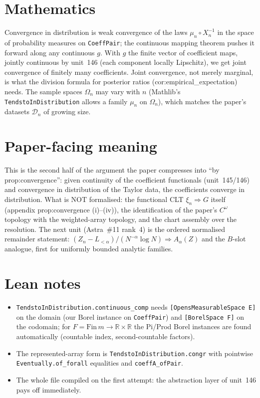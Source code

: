 \documentclass[11pt]{article}
\begin{document}
\section{Mathematics}
Convergence in distribution is weak convergence of the laws $\mu_n\circ X_n^{-1}$ in the space of
probability measures on \texttt{CoeffPair}; the continuous mapping theorem pushes it forward along
any continuous $g$. With $g$ the finite vector of coefficient maps, jointly continuous by unit~146
(each component locally Lipschitz), we get joint convergence of finitely many coefficients. Joint
convergence, not merely marginal, is what the division formula for posterior ratios
(cor:empirical\_expectation) needs. The sample spaces $\Omega_n$ may vary with $n$ (Mathlib's
\texttt{TendstoInDistribution} allows a family $\mu_n$ on $\Omega_n$), which matches the paper's
datasets $\mathcal D_n$ of growing size.

\section{Paper-facing meaning}
This is the second half of the argument the paper compresses into ``by prop:convergence'': given
continuity of the coefficient functionals (unit~145/146) and convergence in distribution of the
Taylor data, the coefficients converge in distribution. What is NOT formalised: the functional CLT
$\xi_n\Rightarrow G$ itself (appendix prop:convergence (i)--(iv)), the identification of the
paper's $C^\omega$ topology with the weighted-array topology, and the chart assembly over the
resolution. The next unit (Astra~\#11 rank~4) is the ordered normalised remainder statement:
$(Z_n-L_{<\alpha})/(N^{-\alpha}\log N)\Rightarrow A_\alpha(Z)$ and the $B$-slot analogue, first
for uniformly bounded analytic families.

\section{Lean notes}
\begin{itemize}
\item \texttt{TendstoInDistribution.continuous\_comp} needs \texttt{[OpensMeasurableSpace E]} on the
domain (our Borel instance on \texttt{CoeffPair}) and \texttt{[BorelSpace F]} on the codomain;
for $F=\mathrm{Fin}\,m\to\mathbb R\times\mathbb R$ the Pi/Prod Borel instances are found
automatically (countable index, second-countable factors).
\item The represented-array form is \texttt{TendstoInDistribution.congr} with pointwise
\texttt{Eventually.of\_forall} equalities and \texttt{coeffA\_ofPair}.
\item The whole file compiled on the first attempt: the abstraction layer of unit~146 pays off
immediately.
\end{itemize}
\end{document}
